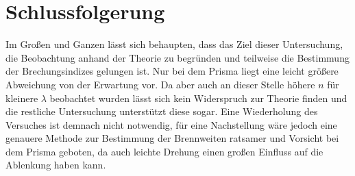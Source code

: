 \section{Schlussfolgerung}

	Im Großen und Ganzen lässt sich behaupten, dass das Ziel dieser Untersuchung, die Beobachtung anhand der Theorie zu begründen und teilweise die Bestimmung der Brechungsindizes  gelungen ist.
	Nur bei dem Prisma liegt eine leicht größere Abweichung von der Erwartung vor.
	Da aber auch an dieser Stelle höhere $n$ für kleinere $\lambda$ beobachtet wurden lässt sich kein Widerspruch zur Theorie finden und die restliche Untersuchung unterstützt diese sogar.
	Eine Wiederholung des Versuches ist demnach nicht notwendig, für eine Nachstellung wäre jedoch eine genauere Methode zur Bestimmung der Brennweiten ratsamer und Vorsicht bei dem Prisma geboten, da auch leichte Drehung einen großen Einfluss auf die Ablenkung haben kann.  